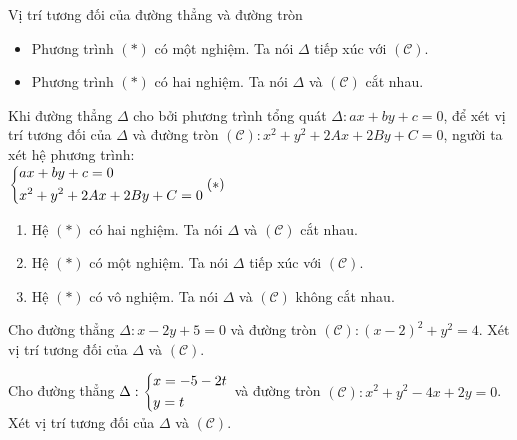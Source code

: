 \begin{dang}{Vị trí tương đối của đường thẳng và đường tròn}
\begin{note}
\begin{enumerate}
\begin{itemize}
				\item Phương trình $(\ast)$ có một nghiệm. Ta nói $\Delta$ tiếp xúc với $\mathcal{(C)}$.
				\item Phương trình $(\ast)$ có hai nghiệm. Ta nói $\Delta$ và $\mathcal{(C)}$ cắt nhau.
			\end{itemize}
		\end{enumerate}
	\end{note}
	\begin{note}
		Khi đường thẳng $\Delta$ cho bởi phương trình tổng quát $\Delta:ax+by+c=0$, để xét vị trí tương đối của $\Delta$ và đường tròn  $\mathcal{(C)}:x^2+y^2+2Ax+2By+C=0$, người ta xét hệ phương trình:\\  $\left\{\begin{aligned}&ax+by+c=0\\&x^2+y^2+2Ax+2By+C=0\end{aligned}\right. (\ast)$ 
		\begin{enumerate}
			\item Hệ  $(\ast)$ có hai nghiệm. Ta nói $\Delta$ và $\mathcal{(C)}$ cắt nhau. 
			\item Hệ  $(\ast)$ có một nghiệm. Ta nói $\Delta$ tiếp xúc với $\mathcal{(C)}$.
			\item Hệ  $(\ast)$ có vô nghiệm. Ta nói $\Delta$ và $\mathcal{(C)}$ không cắt nhau.
		\end{enumerate}
	\end{note}
\end{dang}
\begin{vd}%
	[Lê Quốc Hiệp][0H3B2]
	Cho đường thẳng $\Delta:x-2y+5=0$ và đường tròn $\mathcal{(C)}:(x-2)^2+y^2=4$. Xét vị trí tương đối của $\Delta$ và $\mathcal{(C)}$.
\end{vd}
\begin{vd}%
	Cho đường thẳng $\Delta:\left\{\begin{aligned}&x=-5-2t\\&y=t\end{aligned}\right.$ và đường tròn $\mathcal{(C)}:x^2+y^2-4x+2y=0$. Xét vị trí tương đối của $\Delta$ và $\mathcal{(C)}$.
\end{vd}

